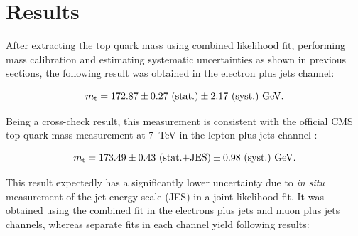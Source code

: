 \begin{description}[wide=\parindent]


\end{description}

\newpage
\section{Results}
\label{s_top_mass:results}

After extracting the top quark mass using combined likelihood fit, performing mass calibration and estimating systematic
uncertainties as shown in previous sections, the following result was obtained in the electron plus jets channel:

\begin{equation}
	m_\mathrm{t} = 172.87 \pm 0.27~\textrm{(stat.)} \pm 2.17~\textrm{(syst.)}~\textrm{GeV}.
	\label{final_result}
\end{equation}

Being a cross-check result, this measurement is consistent with the official CMS top quark mass measurement at
\SI{7}{\TeV} in the lepton plus jets channel \autocite{top_mass_ljets_CMS}:

\begin{equation}
	m_\mathrm{t} = 173.49 \pm 0.43~\textrm{(stat.+JES)} \pm 0.98~\textrm{(syst.)}~\textrm{GeV}.
	\label{final_result_official_ljets}
\end{equation}

This result expectedly has a significantly lower uncertainty due to \textit{in situ} measurement of the jet energy scale
(JES) in a joint likelihood fit. It was obtained using the combined fit in the electrons plus jets and muon plus jets
channels, whereas separate fits in each channel yield following results:

